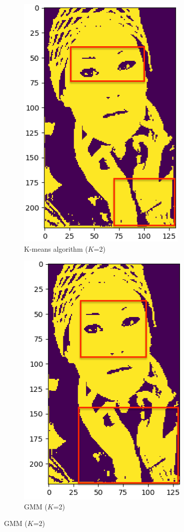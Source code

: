\documentclass[conference]{IEEEtran}
\begin{document}
\begin{figure}
    \begin{subfigure}{.5\linewidth}
        \centering
        \includegraphics[height=0.7\textwidth]{imgresults/face_kmeans.png}
        \caption{K-means algorithm ($K$=2)}
        \label{fig:sub1}
      \end{subfigure}%
      \begin{subfigure}{.5\linewidth}
          \centering
          \includegraphics[height=0.7\textwidth]{imgresults/face_gmm.png}
          \caption{GMM ($K$=2)}
          \label{fig:histogram}
      \end{subfigure}
      \label{fig:sub}



\end{figure}
\end{document}
